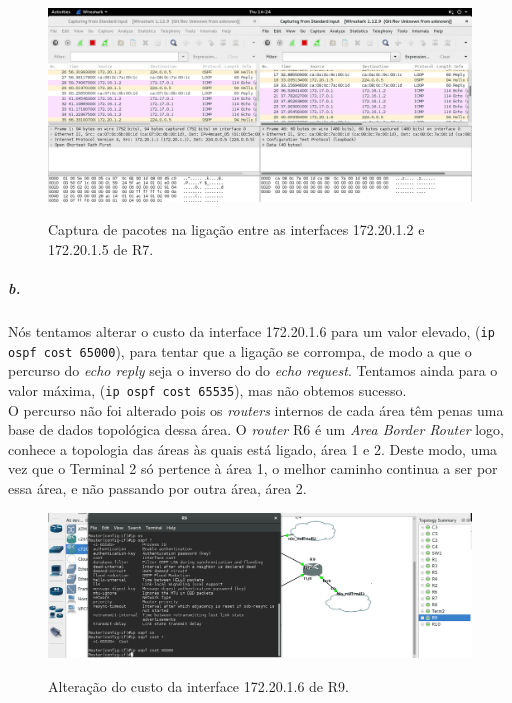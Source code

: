 \begin{figure}[h]
\centering
\includegraphics[width=1\textwidth, height=0.35\textheight]{4a.png}
\label{fig:captura R7}
\caption{Captura de pacotes na ligação entre as interfaces 172.20.1.2 e 172.20.1.5 de \textsf{R7}.}
\end{figure}

\subparagraph{b.}
Nós tentamos alterar o custo da interface 172.20.1.6 para um valor elevado, (\texttt{ip ospf cost 65000}), para tentar que a ligação se corrompa, de modo a que o percurso do \emph{echo reply} seja o inverso do do \emph{echo request}. Tentamos ainda para o valor máxima, (\texttt{ip ospf cost 65535}), mas não obtemos sucesso.\\
O percurso não foi alterado pois os \emph{routers} internos de cada área têm penas uma base de dados topológica dessa área. O \emph{router} \textsf{R6} é um \emph{Area Border Router} logo, conhece a topologia das áreas às quais está ligado, área 1 e 2. Deste modo, uma vez que o \textsf{Terminal 2} só pertence à área 1, o melhor caminho continua a ser por essa área, e não passando por outra área, área 2.

\begin{figure}[h]
\centering
\includegraphics[width=1\textwidth, height=0.25\textheight]{4b.png}
\label{fig:custo da interface}
\caption{Alteração do custo da interface 172.20.1.6 de \textsf{R9}.}
\end{figure}

